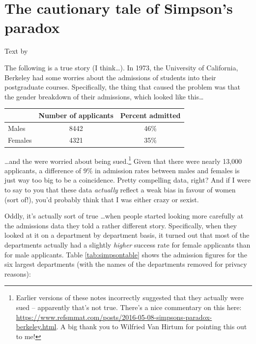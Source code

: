 \documentclass[
]{book}
\begin{document}
\hypertarget{the-cautionary-tale-of-simpsons-paradox}{%
\section{The cautionary tale of Simpson's paradox}\label{the-cautionary-tale-of-simpsons-paradox}}

Text by \citet{Navarro2018}

The following is a true story (I think\ldots). In 1973, the University of California, Berkeley had some worries about the admissions of students into their postgraduate courses. Specifically, the thing that caused the problem was that the gender breakdown of their admissions, which looked like this\ldots{}

\begin{longtable}[]{@{}lcc@{}}
\toprule
& Number of applicants & Percent admitted \\
\midrule
\endhead
Males & 8442 & 46\% \\
Females & 4321 & 35\% \\
\bottomrule
\end{longtable}

\ldots and the were worried about being sued.\footnote{Earlier versions of these notes incorrectly suggested that they actually were sued -- apparently that's not true. There's a nice commentary on this here: \url{https://www.refsmmat.com/posts/2016-05-08-simpsons-paradox-berkeley.html}. A big thank you to Wilfried Van Hirtum for pointing this out to me!} Given that there were nearly 13,000 applicants, a difference of 9\% in admission rates between males and females is just way too big to be a coincidence. Pretty compelling data, right? And if I were to say to you that these data \emph{actually} reflect a weak bias in favour of women (sort of!), you'd probably think that I was either crazy or sexist.

Oddly, it's actually sort of true \ldots when people started looking more carefully at the admissions data \citep{Bickel1975} they told a rather different story. Specifically, when they looked at it on a department by department basis, it turned out that most of the departments actually had a slightly \emph{higher} success rate for female applicants than for male applicants. Table \ref{tab:simpsontable} shows the admission figures for the six largest departments (with the names of the departments removed for privacy reasons):
\end{document}
